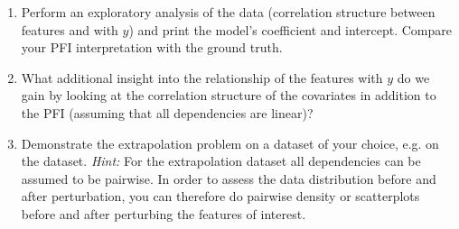 {\begin{enumerate}
\begin{enumerate}
        \item Which features are (in)dependent with $Y$?
        \item Which features are (in)dependent with its covariates?
        \item Which features are dependent with $Y$, given all covariates?
    \end{enumerate}
    \item Perform an exploratory analysis of the data (correlation structure between features and with $y$) and print the model's coefficient and intercept. Compare your PFI interpretation with the ground truth.
    \item What additional insight into the relationship of the features with $y$ do we gain by looking at the correlation structure of the covariates in addition to the PFI (assuming that all dependencies are linear)?
    \item Demonstrate the extrapolation problem on a dataset of your choice, e.g. on the  dataset. \textit{Hint:} For the extrapolation dataset all dependencies can be assumed to be pairwise. In order to assess the data distribution before and after perturbation, you can therefore do pairwise density or scatterplots before and after perturbing the features of interest.
\end{enumerate}

}
